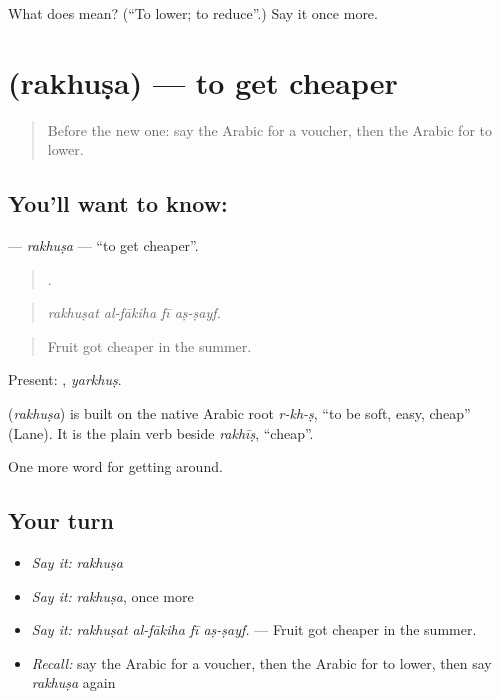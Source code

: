 \begin{tcolorbox}[breakable,colback=teal!4,colframe=teal!35!black,title={Before you move on}]
What does  mean? (\textquotedblleft{}To lower; to reduce\textquotedblright{}.) Say it once more.
\end{tcolorbox}
\section[\texorpdfstring{\ar{رخص} (rakhuṣa)}{رخص (rakhuṣa)}]{ (rakhuṣa) — to get cheaper}

\label{lesson:AR-C457-rakhusa}



\begin{quote}
Before the new one: say the Arabic for a voucher, then the Arabic for to lower.
\end{quote}

\subsection*{You'll want to know: }
\textbf{} — \emph{rakhuṣa} — \textquotedblleft{}to get cheaper\textquotedblright{}.

\begin{quote}
   .
\end{quote}

\begin{quote}
\emph{rakhuṣat al-fākiha fī aṣ-ṣayf.}
\end{quote}

\begin{quote}
Fruit got cheaper in the summer.
\end{quote}

Present: , \emph{yarkhuṣ}.

\begin{cousinweb}
\textbf{} (\emph{rakhuṣa}) is built on the native Arabic root \emph{r-kh-ṣ}, \textquotedblleft{}to be soft, easy, cheap\textquotedblright{} (Lane). It is the plain verb beside \emph{rakhīṣ}, \textquotedblleft{}cheap\textquotedblright{}.
\end{cousinweb}

\begin{grammarlens}[title={What you've built}]
One more word for getting around.
\end{grammarlens}

\subsection*{Your turn}
\begin{itemize}
\raggedright
  \item \emph{Say it:} \emph{rakhuṣa}
  \item \emph{Say it:} \emph{rakhuṣa}, once more
  \item \emph{Say it:} \emph{rakhuṣat al-fākiha fī aṣ-ṣayf.} — Fruit got cheaper in the summer.
  \item \emph{Recall:} say the Arabic for a voucher, then the Arabic for to lower, then say \emph{rakhuṣa} again
\end{itemize}


